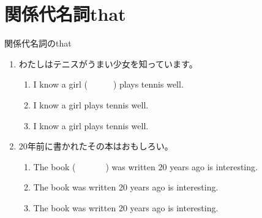 \documentclass[aspectratio=169,xcolor={dvipsnames,table}]{beamer}
\begin{document}
\section{関係代名詞that}
\begin{frame}[plain]{関係代名詞のthat}
 \begin{enumerate}
  \item<1-> わたしはテニスがうまい少女を知っています。%
\mbox{}\hfill{\scriptsize {}}
	\begin{enumerate}
	 \item<1-> I know a girl (~~~~~~) plays tennis well.
	 \item<2-> I know a girl  plays tennis well.
	 \item<5-> I know a girl  plays tennis well.
	\end{enumerate}
  \item<1-> 20年前に書かれたその本はおもしろい。
       \begin{enumerate}
	\item<1-> The book (~~~~~~~) was written 20 years ago is interesting.
	\item<3->  The book  was written 20 years ago is interesting.
	\item<6->  The book  was written 20 years ago is interesting.
       \end{enumerate}
 \end{enumerate}

\end{frame}
\end{document}
